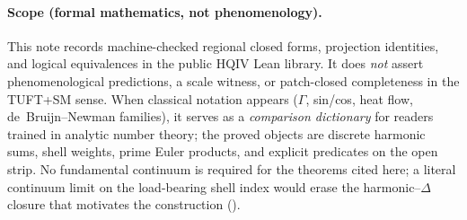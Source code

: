 
\providecommand{\leanfile}[1]{\nolinkurl{#1}}
\providecommand{\leanid}[1]{\nolinkurl{#1}}

\paragraph{Scope (formal mathematics, not phenomenology).}
This note records machine-checked regional closed forms, projection identities,
and logical equivalences in the public HQIV Lean library.  It does \emph{not}
assert phenomenological predictions, a scale witness, or patch-closed
completeness in the TUFT+SM sense.  When classical notation appears ($\Gamma$,
sin/cos, heat flow, de~Bruijn--Newman families), it serves as a
\emph{comparison dictionary} for readers trained in analytic number theory; the
proved objects are discrete harmonic sums, shell weights, prime Euler products,
and explicit predicates on the open strip.  No fundamental continuum is required
for the theorems cited here; a literal continuum limit on the load-bearing shell
index would erase the harmonic--$\Delta$ closure that motivates the construction
(\cite{hqiv-so8-paper}).
